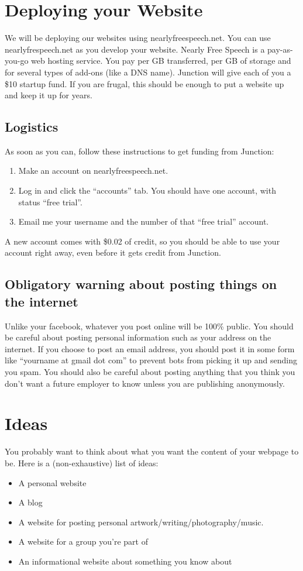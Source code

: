 \documentclass{article}
\begin{document}
\section{Deploying your Website}
We will be deploying our websites using nearlyfreespeech.net.  You can use nearlyfrespeech.net as you develop your website.
Nearly Free Speech is a pay-as-you-go web hosting service.  You pay per GB transferred, per GB of storage and for several types of add-ons (like a DNS name).  Junction will give each of you a \$10 startup fund.  If you are frugal, this should be enough to put a website up and keep it up for years.

\subsection*{Logistics}
As soon as you can, follow these instructions to get funding from Junction:

\begin{enumerate}
\item Make an account on nearlyfreespeech.net.
\item Log in and click the ``accounts'' tab.  You should have one account, with status ``free trial''.
\item Email me your username and the number of that ``free trial'' account.
\end{enumerate}
A new account comes with \$0.02 of credit, so you should be able to use your account right away, even before it gets credit from Junction.

\subsection*{Obligatory warning about posting things on the internet}
Unlike your facebook, whatever you post online will be 100\% public.  You should be careful about posting personal information such as your address on the internet.  If you choose to post an email address, you should post it in some form like ``yourname at gmail dot com'' to prevent bots from picking it up and sending you spam.  You should also be careful about posting anything that you think you don't want a future employer to know unless you are publishing anonymously.

\section{Ideas}
You probably want to think about what you want the content of your webpage to be.  Here is a (non-exhaustive) list of ideas:
\begin{itemize}
\item A personal website
\item A blog
\item A website for posting personal artwork/writing/photography/music.
\item A website for a group you're part of
\item An informational website about something you know about
\end{itemize}
\end{document}
